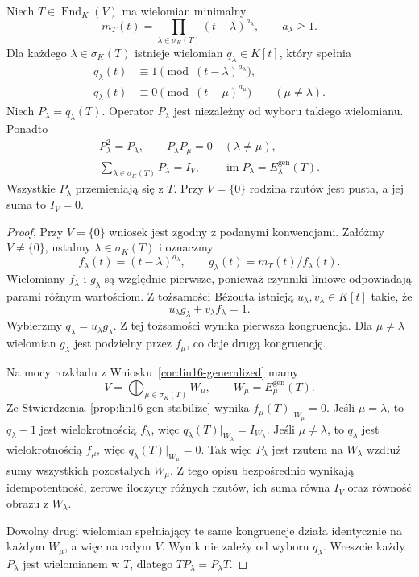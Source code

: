 \begin{twierdzenie}
\label{thm:lin18-projectors}
Niech \(T\in\operatorname{End}_K(V)\)
ma wielomian minimalny
\[
 m_T(t)=\prod_{\lambda\in\sigma_K(T)}
             (t-\lambda)^{a_\lambda},
 \qquad a_\lambda\ge1.
\]
Dla każdego \(\lambda\in\sigma_K(T)\)
istnieje wielomian \(q_\lambda\in K[t]\),
który spełnia
\[
 \begin{split}
 q_\lambda(t)&\equiv1
        \pmod{(t-\lambda)^{a_\lambda}},\\
 q_\lambda(t)&\equiv0
        \pmod{(t-\mu)^{a_\mu}}
        \qquad(\mu\ne\lambda).
 \end{split}
\]
Niech \(P_\lambda=q_\lambda(T)\).
Operator \(P_\lambda\) jest niezależny
od wyboru takiego wielomianu.
Ponadto
\[
 \begin{gathered}
 P_\lambda^2=P_\lambda,\qquad
 P_\lambda P_\mu=0\quad(\lambda\ne\mu),\\
 \sum_{\lambda\in\sigma_K(T)}P_\lambda=I_V,\qquad
 \operatorname{im}P_\lambda
       =E_\lambda^{\mathrm{gen}}(T).
 \end{gathered}
\]
Wszystkie \(P_\lambda\) przemieniają się z \(T\).
Przy \(V=\{0\}\) rodzina rzutów jest pusta,
a jej suma to \(I_V=0\).
\end{twierdzenie}
\begin{proof}
Przy \(V=\{0\}\) wniosek jest zgodny
z podanymi konwencjami.
Załóżmy \(V\ne\{0\}\), ustalmy
\(\lambda\in\sigma_K(T)\) i oznaczmy
\[
 f_\lambda(t)=(t-\lambda)^{a_\lambda},
 \qquad
 g_\lambda(t)=m_T(t)/f_\lambda(t).
\]
Wielomiany \(f_\lambda\) i \(g_\lambda\)
są względnie pierwsze, ponieważ czynniki
liniowe odpowiadają parami różnym wartościom.
Z tożsamości Bézouta istnieją
\(u_\lambda,v_\lambda\in K[t]\)
takie, że
\[
 u_\lambda g_\lambda+v_\lambda f_\lambda=1.
\]
Wybierzmy \(q_\lambda=u_\lambda g_\lambda\).
Z tej tożsamości wynika pierwsza kongruencja.
Dla \(\mu\ne\lambda\) wielomian
\(g_\lambda\) jest podzielny
przez \(f_\mu\), co daje drugą kongruencję.

Na mocy rozkładu z
Wniosku~\ref{cor:lin16-generalized}
mamy
\[
 V=\bigoplus_{\mu\in\sigma_K(T)}W_\mu,
 \qquad
 W_\mu=E_\mu^{\mathrm{gen}}(T).
\]
Ze
Stwierdzenia~\ref{prop:lin16-gen-stabilize}
wynika \(f_\mu(T)|_{W_\mu}=0\).
Jeśli \(\mu=\lambda\), to
\(q_\lambda-1\) jest wielokrotnością
\(f_\lambda\), więc
\(q_\lambda(T)|_{W_\lambda}=I_{W_\lambda}\).
Jeśli \(\mu\ne\lambda\), to
\(q_\lambda\) jest wielokrotnością \(f_\mu\),
więc \(q_\lambda(T)|_{W_\mu}=0\).
Tak więc \(P_\lambda\) jest rzutem
na \(W_\lambda\) wzdłuż sumy wszystkich
pozostałych \(W_\mu\).
Z tego opisu bezpośrednio wynikają
idempotentność, zerowe iloczyny różnych
rzutów, ich suma równa \(I_V\)
oraz równość obrazu z \(W_\lambda\).

Dowolny drugi wielomian spełniający
te same kongruencje działa identycznie
na każdym \(W_\mu\), a więc na całym \(V\).
Wynik nie zależy od wyboru \(q_\lambda\).
Wreszcie każdy \(P_\lambda\) jest wielomianem
w \(T\), dlatego \(TP_\lambda=P_\lambda T\).
\end{proof}

